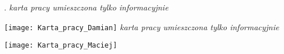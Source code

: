\newpage
{\tiny .}
\thispagestyle{empty}
\setcounter{page}{0}
\newpage
\textit{karta pracy umieszczona tylko informacyjnie}

\texttt{[image: Karta\_pracy\_Damian]}
\newpage
\textit{karta pracy umieszczona tylko informacyjnie}

\texttt{[image: Karta\_pracy\_Maciej]}

